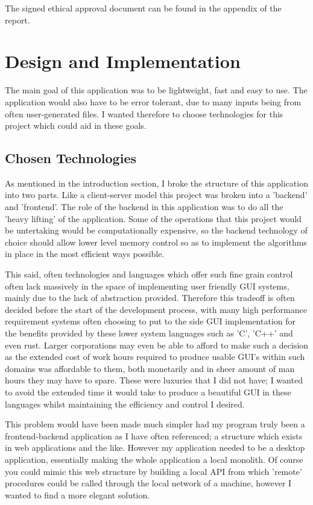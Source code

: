 \documentclass[a4paper,11pt]{article}
\begin{document}
The signed ethical approval document can be found in the appendix of the report.

\section{Design and Implementation}
The main goal of this application was to be lightweight, fast and easy to use. The application would also have to be error tolerant, due to many inputs being from often user-generated files. I wanted therefore to choose technologies for this project which could aid in these goals.

\subsection{Chosen Technologies}
As mentioned in the introduction section, I broke the structure of this application into two parts. Like a client-server model this project was broken into a 'backend' and 'frontend'. The role of the backend in this application was to do all the 'heavy lifting' of the application. Some of the operations that this project would be untertaking would be computationally expensive, so the backend technology of choice should allow lower level memory control so as to implement the algorithms in place in the most efficient ways possible.

This said, often technologies and languages which offer such fine grain control often lack massively in the space of implementing user friendly GUI systems, mainly due to the lack of abstraction provided. Therefore this tradeoff is often decided before the start of the development process, with many high performance requirement systems often choosing to put to the side GUI implementation for the benefits provided by these lower system languages such as 'C', 'C++' and even rust. Larger corporations may even be able to afford to make such a decision as the extended cost of work hours required to produce usable GUI's within such domains was affordable to them, both monetarily and in sheer amount of man hours they may have to spare. These were luxuries that I did not have; I wanted to avoid the extended time it would take to produce a beautiful GUI in these languages whilst maintaining the efficiency and control I desired. 

This problem would have been made much simpler had my program truly been a frontend-backend application as I have often referenced; a structure which exists in web applications and the like. However my application needed to be a desktop application, essentially making the whole application a local monolith. Of course you could mimic this web structure by building a local API from which 'remote' procedures could be called through the local network of a machine, however I wanted to find a more elegant solution.
\end{document}
